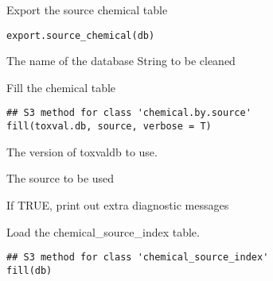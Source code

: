 \documentclass[letterpaper]{book}
\begin{document}
%
\begin{Description}\relax
Export the source chemical table
\end{Description}
%
\begin{Usage}
\begin{verbatim}
export.source_chemical(db)
\end{verbatim}
\end{Usage}
%
\begin{Arguments}
\begin{ldescription}
\item[\code{db}] The name of the database String to be cleaned
\end{ldescription}
\end{Arguments}
%
\begin{Description}\relax
Fill the chemical table
\end{Description}
%
\begin{Usage}
\begin{verbatim}
## S3 method for class 'chemical.by.source'
fill(toxval.db, source, verbose = T)
\end{verbatim}
\end{Usage}
%
\begin{Arguments}
\begin{ldescription}
\item[\code{toxval.db}] The version of toxvaldb to use.

\item[\code{source}] The source to be used

\item[\code{verbose}] If TRUE, print out extra diagnostic messages
\end{ldescription}
\end{Arguments}
%
\begin{Description}\relax
Load the chemical\_source\_index table.
\end{Description}
%
\begin{Usage}
\begin{verbatim}
## S3 method for class 'chemical_source_index'
fill(db)
\end{verbatim}
\end{Usage}
\end{document}
